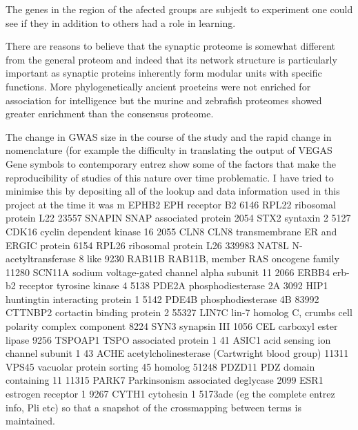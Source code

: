 The genes in the region of the afected groups are subjedt to experiment one could see if they in addition to others had a role in learning.

There are reasons to believe that the synaptic proteome is somewhat different from the general proteom and indeed that its network structure is particularly important as synaptic proteins inherently form modular units with specific functions. More phylogenetically ancient proeteins were not enriched for association for intelligence but the murine and zebrafish proteomes showed greater enrichment than the consensus proteome.

The change in GWAS size in the course of the study and the rapid change in nomenclature (for example the difficulty in translating the output of VEGAS Gene symbols to contemporary entrez show some of the factors that make the reproducibility of studies of this nature over time problematic. I have tried to minimise this by depositing all of the lookup and data information used in this project at the time it was m	EPHB2	EPH receptor B2
6146	RPL22	ribosomal protein L22
23557	SNAPIN	SNAP associated protein
2054	STX2	syntaxin 2
5127	CDK16	cyclin dependent kinase 16
2055	CLN8	CLN8 transmembrane ER and ERGIC protein
6154	RPL26	ribosomal protein L26
339983	NAT8L	N-acetyltransferase 8 like
9230	RAB11B	RAB11B, member RAS oncogene family
11280	SCN11A	sodium voltage-gated channel alpha subunit 11
2066	ERBB4	erb-b2 receptor tyrosine kinase 4
5138	PDE2A	phosphodiesterase 2A
3092	HIP1	huntingtin interacting protein 1
5142	PDE4B	phosphodiesterase 4B
83992	CTTNBP2	cortactin binding protein 2
55327	LIN7C	lin-7 homolog C, crumbs cell polarity complex component
8224	SYN3	synapsin III
1056	CEL	carboxyl ester lipase
9256	TSPOAP1	TSPO associated protein 1
41	ASIC1	acid sensing ion channel subunit 1
43	ACHE	acetylcholinesterase (Cartwright blood group)
11311	VPS45	vacuolar protein sorting 45 homolog
51248	PDZD11	PDZ domain containing 11
11315	PARK7	Parkinsonism associated deglycase
2099	ESR1	estrogen receptor 1
9267	CYTH1	cytohesin 1
5173ade (eg the complete entrez info, Pli etc) so that a snapshot of the crossmapping between terms is maintained. 

